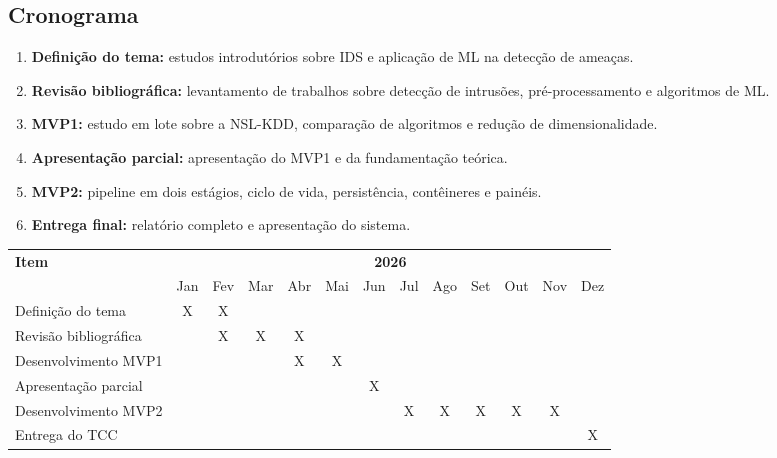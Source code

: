 \subsection{Cronograma}

\begin{enumerate}
	\item \textbf{Definição do tema:} estudos introdutórios sobre IDS e aplicação de ML na detecção de ameaças.
	\item \textbf{Revisão bibliográfica:} levantamento de trabalhos sobre detecção de intrusões, pré-processamento e algoritmos de ML.
	\item \textbf{MVP1:} estudo em lote sobre a NSL-KDD, comparação de algoritmos e redução de dimensionalidade.
	\item \textbf{Apresentação parcial:} apresentação do MVP1 e da fundamentação teórica.
	\item \textbf{MVP2:} pipeline em dois estágios, ciclo de vida, persistência, contêineres e painéis.
	\item \textbf{Entrega final:} relatório completo e apresentação do sistema.
\end{enumerate}

\begin{strip}
\centering
\footnotesize
\renewcommand{\arraystretch}{0.9}
\setlength{\tabcolsep}{2pt}
\begin{tabular}{|p{2.8cm}|*{12}{c|}}
\hline
\multirow{2}{*}{\textbf{Item}} & \multicolumn{12}{c|}{\textbf{2026}} \\ \cline{2-13}
& Jan & Fev & Mar & Abr & Mai & Jun & Jul & Ago & Set & Out & Nov & Dez \\
\hline
Definição do tema       & X & X &   &   &   &   &   &   &   &   &   &   \\ \hline
Revisão bibliográfica   &   & X & X & X &   &   &   &   &   &   &   &   \\ \hline
Desenvolvimento MVP1    &   &   &   & X & X &   &   &   &   &   &   &   \\ \hline
Apresentação parcial    &   &   &   &   &   & X &   &   &   &   &   &   \\ \hline
Desenvolvimento MVP2    &   &   &   &   &   &   & X & X & X & X & X &   \\ \hline
Entrega do TCC          &   &   &   &   &   &   &   &   &   &   &   & X \\ \hline
\end{tabular}
\end{strip}
